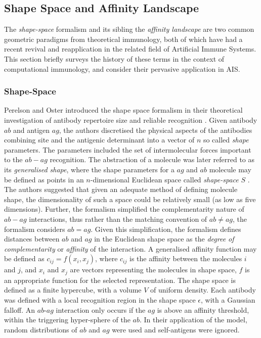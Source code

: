 %
%
\subsection{Shape Space and Affinity Landscape}
\label{subsec:cs:ssandal}
The \emph{shape-space} formalism and its sibling the \emph{affinity landscape} are two common geometric paradigms from theoretical immunology, both of which have had a recent revival and reapplication in the related field of Artificial Immune Systems. This section briefly surveys the history of these terms in the context of computational immunology, and consider their pervasive application in AIS. 

%
%
\subsubsection{Shape-Space}
Perelson and Oster introduced the shape space formalism in their theoretical investigation of antibody repertoire size and reliable recognition \cite{Perelson1979}. Given antibody $ab$ and antigen $ag$, the authors discretised the physical aspects of the antibodies combining site and the antigenic determinant into a vector of $n$ so called \emph{shape} parameters. The parameters included the set of intermolecular forces important to the $ab-ag$ recognition. The abstraction of a molecule was later referred to as its \emph{generalised shape}, where the shape parameters for a $ag$ and $ab$ molecule may be defined as points in an $n$-dimensional Euclidean space called \emph{shape-space} $S$ \cite{Perelson1989}. The authors suggested that given an adequate method of defining molecule shape, the dimensionality of such a space could be relatively small (as low as five dimensions). Further, the formalism simplified the complementarity nature of $ab-ag$ interactions, thus rather than the matching convention of $ab \neq ag$, the formalism considers $ab=ag$. Given this simplification, the formalism defines distances between $ab$ and $ag$ in the Euclidean shape space as the \emph{degree of complementarity} or \emph{affinity} of the interaction. A generalised affinity function may be defined as $c_{ij}=f(x_{i},x_{j})$, where $c_{ij}$ is the affinity between the molecules $i$ and $j$, and $x_{i}$ and $x_{j}$ are vectors representing the molecules in shape space, $f$ is an appropriate function for the selected representation. The shape space is defined as a finite hypercube, with a volume $V$ of uniform density. Each antibody was defined with a local recognition region in the shape space $\epsilon$, with a Gaussian falloff. An $ab$-$ag$ interaction only occurs if the $ag$ is above an affinity threshold, within the triggering hyper-sphere of the $ab$. In their application of the model, random distributions of $ab$ and $ag$ were used and self-antigens were ignored.


